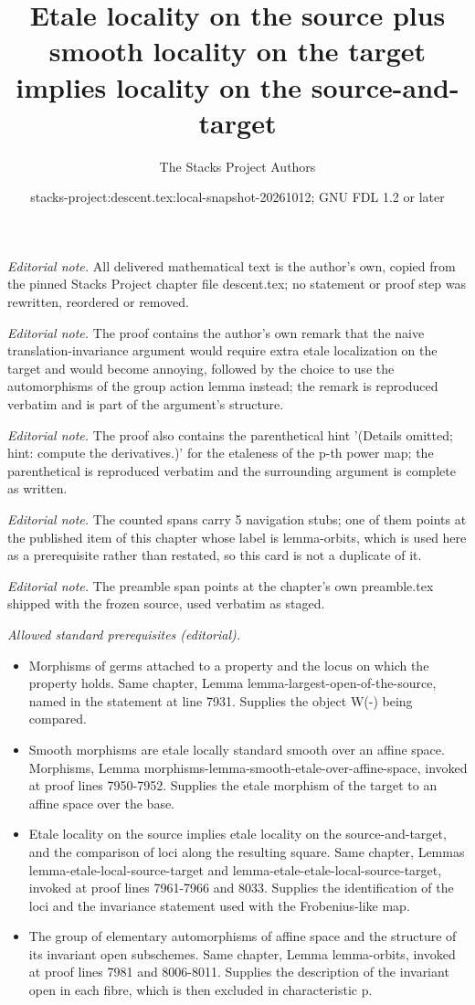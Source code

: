\documentclass{stacks-project}
\title{Etale locality on the source plus smooth locality on the target implies locality on the source-and-target}
\author{The Stacks Project Authors}
\date{stacks-project:descent.tex:local-snapshot-20261012; GNU FDL 1.2 or later}
\theoremstyle{plain}
\theoremstyle{definition}
\theoremstyle{remark}
\numberwithin{equation}{subsection}
\begin{document}
\maketitle
\noindent\textit{Editorial note.} All delivered mathematical text is the author's own, copied from the pinned Stacks Project chapter file descent.tex; no statement or proof step was rewritten, reordered or removed.\par\medskip
\noindent\textit{Editorial note.} The proof contains the author's own remark that the naive translation-invariance argument would require extra etale localization on the target and would become annoying, followed by the choice to use the automorphisms of the group action lemma instead; the remark is reproduced verbatim and is part of the argument's structure.\par\medskip
\noindent\textit{Editorial note.} The proof also contains the parenthetical hint '(Details omitted; hint: compute the derivatives.)' for the etaleness of the p-th power map; the parenthetical is reproduced verbatim and the surrounding argument is complete as written.\par\medskip
\noindent\textit{Editorial note.} The counted spans carry 5 navigation stubs; one of them points at the published item of this chapter whose label is lemma-orbits, which is used here as a prerequisite rather than restated, so this card is not a duplicate of it.\par\medskip
\noindent\textit{Editorial note.} The preamble span points at the chapter's own preamble.tex shipped with the frozen source, used verbatim as staged.\par\medskip
\noindent\textit{Allowed standard prerequisites (editorial).}\begin{itemize}
\item Morphisms of germs attached to a property and the locus on which the property holds. Same chapter, Lemma lemma-largest-open-of-the-source, named in the statement at line 7931. Supplies the object W(-) being compared.
\item Smooth morphisms are etale locally standard smooth over an affine space. Morphisms, Lemma morphisms-lemma-smooth-etale-over-affine-space, invoked at proof lines 7950-7952. Supplies the etale morphism of the target to an affine space over the base.
\item Etale locality on the source implies etale locality on the source-and-target, and the comparison of loci along the resulting square. Same chapter, Lemmas lemma-etale-local-source-target and lemma-etale-etale-local-source-target, invoked at proof lines 7961-7966 and 8033. Supplies the identification of the loci and the invariance statement used with the Frobenius-like map.
\item The group of elementary automorphisms of affine space and the structure of its invariant open subschemes. Same chapter, Lemma lemma-orbits, invoked at proof lines 7981 and 8006-8011. Supplies the description of the invariant open in each fibre, which is then excluded in characteristic p.
\end{itemize}\medskip
\end{document}
